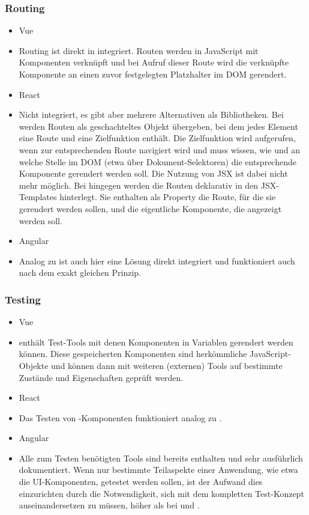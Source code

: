 \subsubsection{Routing}
\begin{itemize}
    \item{Vue}
    \item[] Routing ist direkt in  integriert. Routen werden in JavaScript mit Komponenten verknüpft und bei Aufruf dieser Route wird die verknüpfte Komponente an einen zuvor festgelegten Platzhalter im DOM gerendert.
    \item{React}
    \item[] Nicht integriert, es gibt aber mehrere Alternativen als Bibliotheken. Bei  werden Routen als geschachteltes Objekt übergeben, bei dem jedes Element eine Route und eine Zielfunktion enthält. Die Zielfunktion wird aufgerufen, wenn zur entsprechenden Route navigiert wird und muss wissen, wie und an welche Stelle im DOM (etwa über Dokument-Selektoren) die entsprechende Komponente gerendert werden soll. Die Nutzung von JSX ist dabei nicht mehr möglich. Bei  hingegen werden die Routen deklarativ in den JSX-Templates hinterlegt. Sie enthalten als Property die Route, für die sie gerendert werden sollen, und die eigentliche Komponente, die angezeigt werden soll.
    \item{Angular}
    \item[] Analog zu  ist auch hier eine Lösung direkt integriert und funktioniert auch nach dem exakt gleichen Prinzip.
\end{itemize}

\subsubsection{Testing}
\begin{itemize}
    \item{Vue}
    \item[]  enthält Test-Tools mit denen Komponenten in Variablen gerendert werden können. Diese gespeicherten Komponenten sind herkömmliche JavaScript-Objekte und können dann mit weiteren (externen) Tools auf bestimmte Zustände und Eigenschaften geprüft werden.
    \item{React}
    \item[] Das Testen von -Komponenten funktioniert analog zu .
    \item{Angular}
    \item[] Alle zum Testen benötigten Tools sind bereits enthalten und sehr ausführlich dokumentiert. Wenn nur bestimmte Teilaspekte einer Anwendung, wie etwa die UI-Komponenten, getestet werden sollen, ist der Aufwand dies einzurichten durch die Notwendigkeit, sich mit dem kompletten Test-Konzept auseinandersetzen zu müssen, höher als bei  und .
\end{itemize}

